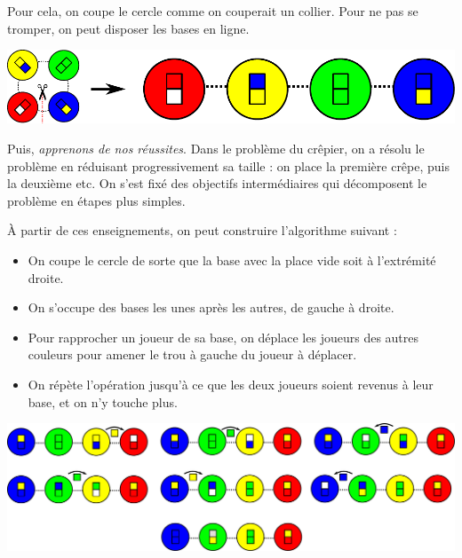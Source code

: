 Pour cela, on coupe le cercle comme on couperait un collier.  Pour ne pas se
tromper, on peut disposer les bases en ligne.

\begin{center}
  \includegraphics[width=\linewidth]{img/baseball_ligne.pdf}
\end{center}

Puis, \textit{apprenons de nos réussites}. Dans le problème du crêpier, on a
résolu le problème en réduisant progressivement sa taille : on place la première
crêpe, puis la deuxième etc. On s'est fixé des objectifs intermédiaires qui
décomposent le problème en étapes plus simples.

À partir de ces enseignements, on peut construire l'algorithme suivant :

\begin{itemize}
\item On coupe le cercle de sorte que la base avec la place vide soit à
  l'extrémité droite.
\item On s'occupe des bases les unes après les autres, de gauche à droite.
\item Pour rapprocher un joueur de sa base, on déplace les joueurs des autres
  couleurs pour amener le trou à gauche du joueur à déplacer.
\item On répète l'opération jusqu'à ce que les deux joueurs soient revenus à
  leur base, et on n'y touche plus.
\end{itemize}

\begin{center}
  \includegraphics[width=\linewidth]{img/baseball_ex3.pdf}
\end{center}

